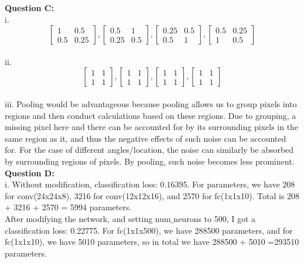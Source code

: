 \documentclass[12 pt]{article}
\begin{document}
	\noindent\textbf{Question C:} \\
	i. 
	\[
	\begin{bmatrix}
	1 & 0.5 \\
	0.5 & 0.25
	\end{bmatrix}
	,
	\begin{bmatrix}
	0.5 & 1 \\
	0.25 & 0.5
	\end{bmatrix}
	,
	\begin{bmatrix}
	0.25 & 0.5 \\
	0.5 & 1
	\end{bmatrix},
	\begin{bmatrix}
	0.5 & 0.25 \\
	1 & 0.5
	\end{bmatrix}
	\] \\
	\noindent ii. 
	\[
	\begin{bmatrix}
	1 & 1 \\
	1 & 1
	\end{bmatrix}
	,
	\begin{bmatrix}
	1 & 1 \\
	1 & 1
	\end{bmatrix}
	,
	\begin{bmatrix}
	1 & 1 \\
	1 & 1
	\end{bmatrix},
	\begin{bmatrix}
	1 & 1 \\
	1 & 1
	\end{bmatrix}
	\] \\
	
	\noindent iii. Pooling would be advantageous because pooling allows us to group pixels into regions and then conduct calculations based on these regions. Due to grouping, a missing pixel here and there can be accounted for by its surrounding pixels in the same region as it, and thus the negative effects of such noise can be accounted for. For the case of different angles/location, the noise can similarly be absorbed by surrounding regions of pixels. By pooling, such noise becomes less prominent.\\
	
	
	\noindent\textbf{Question D:} \\
	\noindent i. Without modification, classification loss: 0.16395. For parameters, we have 208 for conv(24x24x8), 3216 for conv(12x12x16), and 2570 for fc(1x1x10). Total is 208 + 3216 + 2570 = 5994 parameters. \\ 
	
	\noindent After modifying the network, and setting num$\_$neurons to 500, I got a classification loss: 0.22775. For fc(1x1x500), we have 288500 parameters, and for fc(1x1x10), we have 5010 parameters, so in total we have 288500 + 5010 =293510 parameters. \\
	
\end{document}
